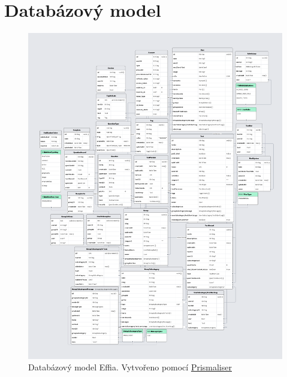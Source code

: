 \documentclass[12pt, a4paper,
openright
]{report}
\let\oldchapter\chapter
\renewcommand{\chapter}{
	\clearpage
	\pagestyle{fancy}
	\oldchapter
}
\begin{document}
	\chapter{Databázový model}

	\begin{figure}[H]
		\centering %
		\includegraphics[width=0.9\linewidth]{image/schema.png} 
		\caption{Databázový model Effia. Vytvořeno pomocí \href{https://github.com/Ovyerus/prismaliser}{Prismaliser}} %
		\label{fig:schema} %
	\end{figure}
	
\end{document}
